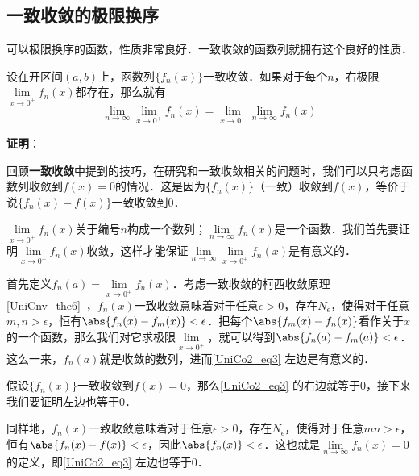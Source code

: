 \subsection{一致收敛的极限换序}

可以极限换序的函数，性质非常良好．一致收敛的函数列就拥有这个良好的性质．

\begin{theorem}{}\label{UniCo2_the1}
设在开区间$(a, b)$上，函数列$\{f_n(x)\}$一致收敛．如果对于每个$n$，右极限$\lim\limits_{x\to 0^+}f_n(x)$都存在，那么就有
\begin{equation}\label{UniCo2_eq3}
\lim\limits_{n\to\infty}\lim\limits_{x\to 0^+}f_n(x)=\lim\limits_{x\to 0^+}\lim\limits_{n\to\infty}f_n(x)
\end{equation}
\end{theorem}

\textbf{证明}：

回顾\textbf{一致收敛}中提到的技巧，在研究和一致收敛相关的问题时，我们可以只考虑函数列收敛到$f(x)=0$的情况．这是因为$\{f_n(x)\}$（一致）收敛到$f(x)$，等价于说$\{f_n(x)-f(x)\}$一致收敛到$0$．

$\lim\limits_{x\to 0^+}f_n(x)$关于编号$n$构成一个数列；$\lim\limits_{n\to\infty}f_n(x)$是一个函数．我们首先要证明$\lim\limits_{x\to 0^+}f_n(x)$收敛，这样才能保证$\lim\limits_{n\to\infty}\lim\limits_{x\to 0^+}f_n(x)$是有意义的．

首先定义$f_n(a)=\lim\limits_{x\to 0^+}f_n(x)$．考虑一致收敛的柯西收敛原理\autoref{UniCnv_the6}~，$f_n(x)$一致收敛意味着对于任意$\epsilon>0$，存在$N_\epsilon$，使得对于任意$m, n>\epsilon$，恒有$\abs{f_n(x)-f_m(x)}<\epsilon$．把每个$\abs{f_m(x)-f_n(x)}$看作关于$x$的一个函数，那么我们对它求极限$\lim\limits_{x\to 0^+}$，就可以得到$\abs{f_n(a)-f_m(a)}<\epsilon$．这么一来，$f_n(a)$就是收敛的数列，进而\autoref{UniCo2_eq3} 左边是有意义的．

假设$\{f_n(x)\}$一致收敛到$f(x)=0$，那么\autoref{UniCo2_eq3} 的右边就等于$0$，接下来我们要证明左边也等于$0$．

同样地，$f_n(x)$一致收敛意味着对于任意$\epsilon>0$，存在$N_\epsilon$，使得对于任意$mn>\epsilon$，恒有$\abs{f_n(x)-f(x)}<\epsilon$，因此$\abs{f_n(x)}<\epsilon$．这也就是$\lim\limits_{n\to\infty}f_n(x)=0$的定义，即\autoref{UniCo2_eq3} 左边也等于$0$．




